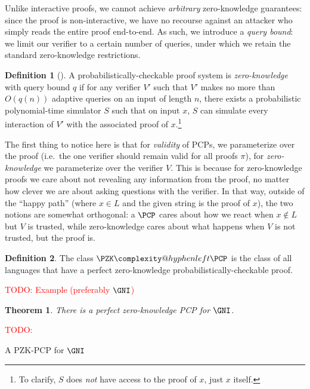 \documentclass[english,12pt]{reedthesis}
\makeatletter
\theoremstyle{plain}
\newtheorem{thm}{Theorem}[section]
\theoremstyle{definition}
\newtheorem{defn}[defn]{Definition}
\theoremstyle{remark}
\newcommand{\PZKPCP}{%
  \PZK\complexity@hyphenleft\PCP
}
\newcommand{\TODO}[1]{\textcolor{red}{TODO: #1}}
\makeatother
\begin{document}
Unlike interactive proofs, we cannot achieve \emph{arbitrary} zero-knowledge
guarantees: since the proof is non-interactive, we have no recourse against an
attacker who simply reads the entire proof end-to-end. As such, we introduce a
\emph{query bound}: we limit our verifier to a certain number
of queries, under which we retain the standard zero-knowledge restrictions.

\begin{defn}[{\cite[Def.\ 8.6]{GOS24}}]\label{def:pzkpcp}
  A probabilistically-checkable proof system is \emph{zero-knowledge} with query
  bound $q$ if for any verifier $V'$ such that $V'$ makes no more than $O(q(n))$
  adaptive queries on an input of length $n$, there exists a probabilistic
  polynomial-time simulator $S$ such that on input $x$, $S$ can simulate every
  interaction of $V'$ with the associated proof of $x$.\footnote{To clarify, $S$
    does \emph{not} have access to the proof of $x$, just $x$ itself.}
\end{defn}

The first thing to notice here is that for \emph{validity} of PCPs, we
parameterize over the proof (i.e.\ the one verifier should remain valid for all
proofs $\pi$), for \emph{zero-knowledge} we parameterize over the verifier $V$.
This is because for zero-knowledge proofs we care about not revealing any
information from the proof, no matter how clever we are about asking questions
with the verifier. In that way, outside of the ``happy path'' (where $x \in L$ and
the given string is the proof of $x$), the two notions are somewhat orthogonal:
a $\PCP$ cares about how we react when $x \notin L$ but $V$ is trusted, while
zero-knowledge cares about what happens when $V$ is not trusted, but the proof
is.

\begin{defn}\label{def:pzkpcp-class}\index{PZK-PCP@$\PZKPCP$}
  The class $\PZKPCP$ is the class of all languages that have a perfect
  zero-knowledge probabilistically-checkable proof.
\end{defn}

\TODO{Example (preferably $\GNI$)}

\begin{thm}\label{thm:gni-pzkpcp}
  There is a perfect zero-knowledge PCP for $\GNI$.
\end{thm}

\begin{algorithm}[htbp]
  \TODO{}
  \caption{A PZK-PCP for $\GNI$}\label{alg:gni-pzkpcp}
\end{algorithm}
\end{document}
